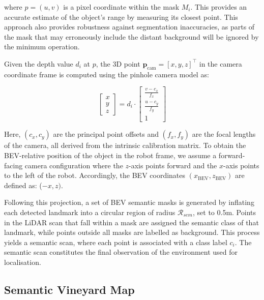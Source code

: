 \documentclass[letterpaper, 10 pt, conference]{ieeeconf}
\begin{document}
where $p=(u,v)$ is a pixel coordinate within the mask $M_i$. This provides an accurate estimate of the object's range by measuring its closest point. This approach also provides robustness against segmentation inaccuracies, as parts of the mask that may erroneously include the distant background will be ignored by the minimum operation.

Given the depth value \(d_i\) at \(p\), the 3D point \(\mathbf{p}_\text{cam} = [x, y, z]^\top\) in the camera coordinate frame is computed using the pinhole camera model as:

\begin{equation}
\begin{bmatrix}
x \\
y \\
z
\end{bmatrix}
=
d_i \cdot
\begin{bmatrix}
\frac{v - c_x}{f_x} \\
\frac{u - c_y}{f_y} \\
1
\end{bmatrix}
\end{equation}

Here, \((c_x, c_y)\) are the principal point offsets and \((f_x, f_y)\) are the focal lengths of the camera, all derived from the intrinsic calibration matrix. To obtain the BEV-relative position of the object in the robot frame, we assume a forward-facing camera configuration where the \(z\)-axis points forward and the \(x\)-axis points to the left of the robot. Accordingly, the BEV coordinates \((x_{\text{BEV}}, z_{\text{BEV}})\) are defined as: (\(-x, z)\). 

Following this projection, a set of BEV semantic masks is generated by inflating each detected landmark into a circular region of radius $\mathcal{R}_{sem}$, set to 0.5m. Points in the LiDAR scan that fall within a mask are assigned the semantic class of that landmark, while points outside all masks are labelled as background. This process yields a semantic scan, where each point is associated with a class label $c_i$. The semantic scan constitutes the final observation of the environment used for localisation.

\subsection{Semantic Vineyard Map}
\label{sec:semantic_map}
\end{document}
